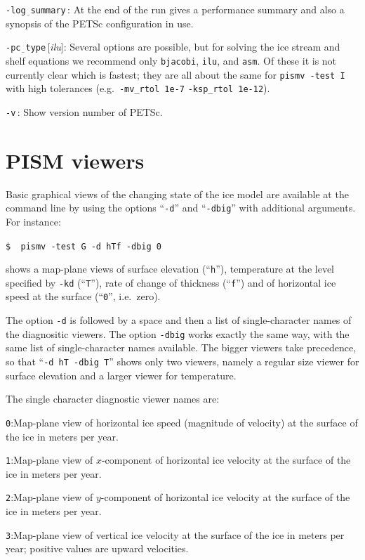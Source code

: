 \documentclass[11pt,final]{amsart}
\renewcommand{\t}[1]{\texttt{#1}}
\newcommand{\rawopt}[1]{\vspace{1mm}\noindent \Large\texttt{-#1}\normalsize}
\newcommand{\opt}[1]{\rawopt{#1}\,:\quad}
\newcommand{\optdef}[2]{\rawopt{#1}\,[\textsl{#2}]:\quad}
\newcommand{\und}{$\underline{\,\,\,}$}
\begin{document}
\opt{log\und summary}  At the end of the run gives a performance summary and also a synopsis of the PETSc configuration in use.

\optdef{pc\und type}{ilu}   Several options are possible, but for solving the ice stream and shelf equations we recommend only \t{bjacobi}, \t{ilu}, and \t{asm}.  Of these it is not currently clear which is fastest; they are all about the same for \verb|pismv -test I| with high tolerances (e.g.~\verb|-mv_rtol 1e-7| \verb|-ksp_rtol 1e-12|).

\opt{v}   Show version number of PETSc.


\clearpage \newpage
\section{PISM viewers}\label{sect:viewers}

Basic graphical views of the changing state of the ice model are available at the command line by using the options ``\t{-d}'' and ``\t{-dbig}'' with additional arguments.  For instance:

\verb|$  pismv -test G -d hTf -dbig 0|

\noindent shows a map-plane views of surface elevation (``\t{h}''), temperature at the level specified by \t{-kd} (``\t{T}''), rate of change of thickness (``\t{f}'') and of horizontal ice speed at the surface (``\t{0}'', i.e.~zero).

The option \t{-d} is followed by a space and then a list of single-character names of the diagnositic viewers.  The option \t{-dbig} works exactly the same way, with the same list of single-character names available.  The bigger viewers take precedence, so that ``\t{-d hT -dbig T}'' shows only two viewers, namely a regular size viewer for surface elevation and a larger viewer for temperature.

The single character diagnostic viewer names are:

\verb|0|:\quad Map-plane view of horizontal ice speed (magnitude of velocity) at the surface of the ice in meters per year.

\verb|1|:\quad Map-plane view of $x$-component of horizontal ice velocity at the surface of the ice in meters per year.

\verb|2|:\quad Map-plane view of $y$-component of horizontal ice velocity at the surface of the ice in meters per year.

\verb|3|:\quad Map-plane view of vertical ice velocity at the surface of the ice in meters per year; positive values are upward velocities.
\end{document}
